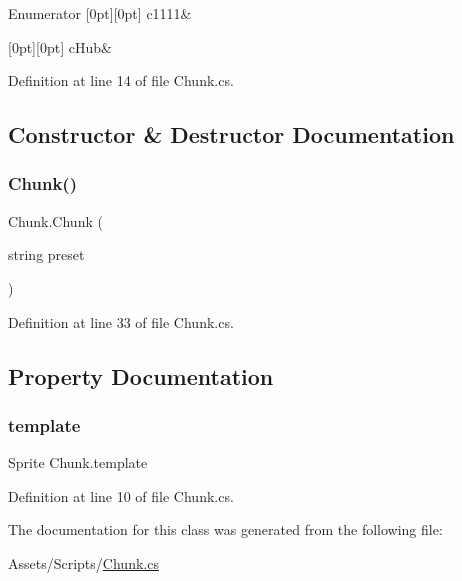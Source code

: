 \begin{DoxyEnumFields}{Enumerator}
[0pt][0pt]{}\mbox{\label{class_chunk_ab2e9c44541a726c19e8f0afbcf82894ca9e8ec7bc0f7942c2c9bc32bfbbd3b591}} 
c1111&\\
\hline

[0pt][0pt]{}\mbox{\label{class_chunk_ab2e9c44541a726c19e8f0afbcf82894ca7c5516c9c767eb37d179548e7e42eee8}} 
c\+Hub&\\
\hline

\end{DoxyEnumFields}


Definition at line 14 of file Chunk.\+cs.



\subsection{Constructor \& Destructor Documentation}
\mbox{\label{class_chunk_a2cf36203919b3a5512c2dd5dc60c446b}} 
\subsubsection{\texorpdfstring{Chunk()}{Chunk()}}
{\footnotesize\ttfamily Chunk.\+Chunk (\begin{DoxyParamCaption}\item[{string}]{preset }\end{DoxyParamCaption})}



Definition at line 33 of file Chunk.\+cs.



\subsection{Property Documentation}
\mbox{\label{class_chunk_a90851ff2883364a1e00753d1fd35461b}} 
\subsubsection{\texorpdfstring{template}{template}}
{\footnotesize\ttfamily Sprite Chunk.\+template\hspace{0.3cm}{\ttfamily [get]}}



Definition at line 10 of file Chunk.\+cs.



The documentation for this class was generated from the following file\+:\begin{DoxyCompactItemize}
\item 
Assets/\+Scripts/\mbox{\hyperlink{_chunk_8cs}{Chunk.\+cs}}\end{DoxyCompactItemize}
